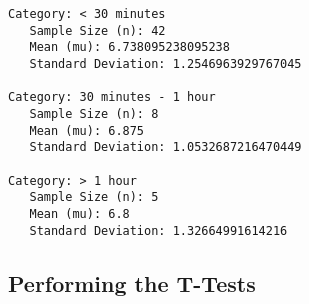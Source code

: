 \documentclass[11pt]{article}
\begin{document}
    \begin{Verbatim}[commandchars=\\\{\}]
Category: < 30 minutes
   Sample Size (n): 42
   Mean (mu): 6.738095238095238
   Standard Deviation: 1.2546963929767045

Category: 30 minutes - 1 hour
   Sample Size (n): 8
   Mean (mu): 6.875
   Standard Deviation: 1.0532687216470449

Category: > 1 hour
   Sample Size (n): 5
   Mean (mu): 6.8
   Standard Deviation: 1.32664991614216

    \end{Verbatim}

    \hypertarget{performing-the-t-tests}{%
\subsection{Performing the T-Tests}\label{performing-the-t-tests}}
\end{document}
